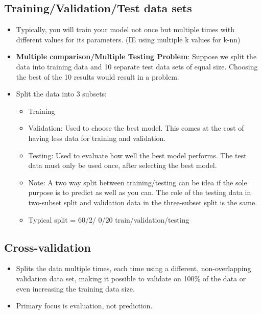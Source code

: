 \documentclass[12pt, oneside]{article}
\begin{document}
\subsection{Training/Validation/Test data sets}
\begin{itemize}
    \item Typically, you will train your model not once but multiple times with different values for its parameters. (IE using multiple k values for k-nn)
    \item \textbf{Multiple comparison/Multiple Testing Problem}: Suppose we split the data into training data and 10 separate test data sets of equal size. Choosing the best of the 10 results would result in a problem.
    
    \item Split the data into 3 subsets:
    \begin{itemize}
        \item Training
        \item Validation: Used to choose the best model. This comes at the cost of having less data for training and validation. 
        \item Testing: Used to evaluate how well the best model performs. The test data must only be used once, after selecting the best model.
        \item Note: A two way split between training/testing can be idea if the sole purpose is to predict as well as you can. The role of the testing data in two-subset split and validation data in the three-subset split is the same. 
        \item Typical split = 60/2/
        0/20 train/validation/testing
    \end{itemize}
\end{itemize}
\subsection{Cross-validation}
\begin{itemize}
    \item Splits the data multiple times, each time using a different, non-overlapping validation data set, making it possible to validate on 100\% of the data or even increasing the training data size. 
    \item Primary focus is evaluation, not prediction.
\end{itemize}
\end{document}
